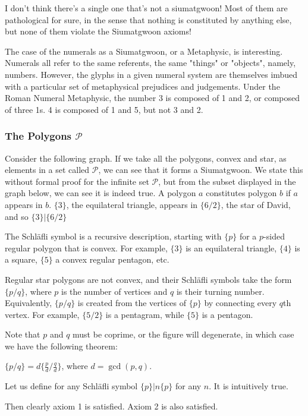 I don't think there's a single one that's not a siumatgwoon! Most of them are pathological for sure, in the sense that nothing is constituted by anything else, but none of them violate the Siumatgwoon axioms! 

The case of the numerals as a Siumatgwoon, or a Metaphysic, is interesting. Numerals all refer to the same referents, the same "things" or "objects", namely, numbers. However, the glyphs in a given numeral system are themselves imbued with a particular set of metaphysical prejudices and judgements. Under the Roman Numeral Metaphysic, the number 3 is composed of 1 and 2, or composed of three 1s. 4 is composed of 1 and 5, but not 3 and 2. 

\subsubsection{The Polygons $\mathcal{P}$}

Consider the following graph. If we take all the polygons, convex and star, as elements in a set called $\mathcal{P}$, we can see that it forms a Siumatgwoon. We state this without formal proof for the infinite set $\mathcal{P}$, but from the subset displayed in the graph below, we can see it is indeed true. A polygon $a$ constitutes polygon $b$ if $a$ appears in $b$. $\{3\}$, the equilateral triangle, appears in $\{6/2\}$, the star of David, and so $\{3\} |\{6/2\}$

The Schläfli symbol is a recursive description, starting with $\{p\}$ for a $p$-sided regular polygon that is convex. For example, $\{3\}$ is an equilateral triangle, $\{4\}$ is a square, $\{5\}$ a convex regular pentagon, etc.

Regular star polygons are not convex, and their Schläfli symbols take the form $\{p/q\}$, where $p$ is the number of vertices and $q$ is their turning number. Equivalently, $\{p/q\}$ is created from the vertices of $\{p\}$ by connecting every $q$th vertex. For example, $\{5/2\}$ is a pentagram, while $\{5\}$ is a pentagon.

Note that $p$ and $q$ must be coprime, or the figure will degenerate, in which case we have the following theorem:

$\{p/q\}=d\{ \frac{p}{d} / \frac{q}{d} \}$, where $d=\gcd(p,q)$.

Let us define for any Schläfli symbol $\{p\} | n\{p\}$ for any $n$. It is intuitively true.

Then clearly axiom 1 is satisfied. Axiom 2 is also satisfied.

